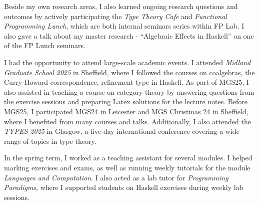Beside my own research areas, I also learned ongoing research questions and outcomes by actively participating the \textit{Type Theory Cafe} and \textit{Functional Programming Lunch}, which are both internal seminars series within FP Lab. I also gave a talk about my master research - ``Algebraic Effects in Haskell'' on one of the FP Lunch seminars.

I had the opportunity to attend large-scale academic events. I attended \textit{Midland Graduate School 2025} in Sheffield, where I followed the courses on coalgebras, the Curry-Howard correspondence, refinement type in Haskell. As part of MGS25, I also assisted in teaching a course on category theory by answering questions from the exercise sessions and preparing Latex solutions for the lecture notes. Before MGS25, I participated MGS24 in Leicester and MGS Christmas 24 in Sheffield, where I benefited from many courses and talks. Additionally, I also attended the \textit{TYPES 2025} in Glasgow, a five-day international conference covering a wide range of topics in type theory.

In the spring term, I worked as a teaching assistant for several modules. I helped marking exercises and exams, as well as running weekly tutorials for the module \textit{Languages and Computation}. I also acted as a lab tutor for \textit{Programming Paradigms}, where I supported students on Haskell exercises during weekly lab sessions.